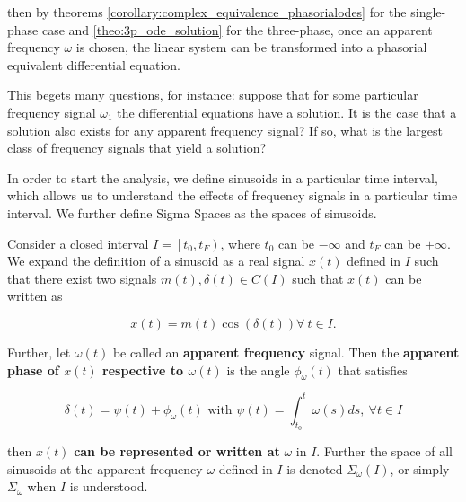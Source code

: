 	\noindent then by theorems \ref{corollary:complex_equivalence_phasorialodes} for the single-phase case and \ref{theo:3p_ode_solution} for the three-phase, once an apparent frequency $\omega$ is chosen, the linear system can be transformed into a phasorial equivalent differential equation.

	This begets many questions, for instance: suppose that for some particular frequency signal $\omega_1$ the differential equations have a solution. It is the case that a solution also exists for any apparent frequency signal? If so, what is the largest class of frequency signals that yield a solution?

	In order to start the analysis, we define sinusoids in a particular time interval, which allows us to understand the effects of frequency signals in a particular time interval. We further define Sigma Spaces as the spaces of sinusoids.

	Consider a closed interval $I = \left[t_0,t_F\right)$, where $t_0$ can be $-\infty$ and $t_F$ can be $+\infty$. We expand the definition of a sinusoid as a real signal $x(t)$ defined in $I$ such that there exist two signals $m(t),\delta(t)\in C\left(I\right)$ such that $x(t)$ can be written as

\begin{equation} x(t) = m(t)\cos\left(\delta(t)\right)\forall\ t\in I. \label{eq:nonstationarydef_def}\end{equation}

	Further, let $\omega(t)$ be called an \textbf{apparent frequency} signal. Then the \textbf{apparent phase of $x(t)$ respective to $\omega(t)$} is the angle $\phi_\omega(t)$ that satisfies

\begin{equation} \delta(t) = \psi(t) + \phi_\omega(t) \text{ with } \psi(t) = \int_{t_0}^t \omega(s)ds,\ \forall t\in I\label{eq:nonstationarydef_def_phi_interval}\end{equation}

	\noindent then $x(t)$ \textbf{can be represented or written at} $\omega$ in $I$. Further the space of all sinusoids at the apparent frequency $\omega$ defined in $I$ is denoted $\Sigma_\omega\left(I\right)$, or simply $\Sigma_{\omega}$ when $I$ is understood.

